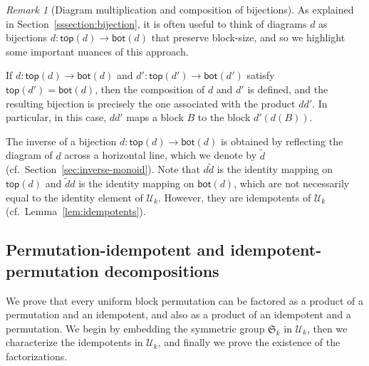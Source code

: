 \documentclass[10pt]{amsart}
\theoremstyle{definition}
\theoremstyle{remark}
\newtheorem{remark}[theorem]{Remark}
\newcommand{\cf}{cf.\ }
\begin{document}
\begin{remark}[Diagram multiplication and composition of bijections]
    \label{remark:composition-and-product}
    As explained in Section~\ref{sssection:bijection},
    it is often useful to think of diagrams $d$ as bijections
    $d : \mathsf{top}(d) \to \mathsf{bot}(d)$ that preserve block-size,
    and so we highlight some important nuances of this approach.

    If $d : \mathsf{top}(d) \to \mathsf{bot}(d)$
    and $d' : \mathsf{top}(d') \to \mathsf{bot}(d')$
    satisfy $\mathsf{top}(d') = \mathsf{bot}(d)$,
    then the composition of $d$ and $d'$ is defined,
    and the resulting bijection is precisely the one
    associated with the product $d d'$.
    In particular, in this case, $d d'$ maps a block $B$ to the block $d'(d(B))$.

    The inverse of a bijection $d : \mathsf{top}(d) \to \mathsf{bot}(d)$
    is obtained by reflecting the diagram of $d$ across a horizontal line,
    which we denote by $\widetilde{d}$ (\cf Section~\ref{sec:inverse-monoid}).
    Note that $d \widetilde{d}$ is the identity mapping on $\mathsf{top}(d)$
    and $\widetilde{d} d $ is the identity mapping on $\mathsf{bot}(d)$,
    which are not necessarily equal to the identity element of $\mathcal{U}_k$.
    However, they are idempotents of $\mathcal{U}_k$ (\cf Lemma~\ref{lem:idempotents}).
\end{remark}

\subsection{Permutation-idempotent and idempotent-permutation decompositions}
\label{section.factorizable}

We prove that every uniform block permutation
can be factored as a product of a permutation and an idempotent,
and also as a product of an idempotent and a permutation.
We begin by embedding the symmetric group $\mathfrak{S}_k$ in $\mathcal{U}_k$,
then we characterize the idempotents in $\mathcal{U}_k$,
and finally we prove the existence of the factorizations.
\end{document}
